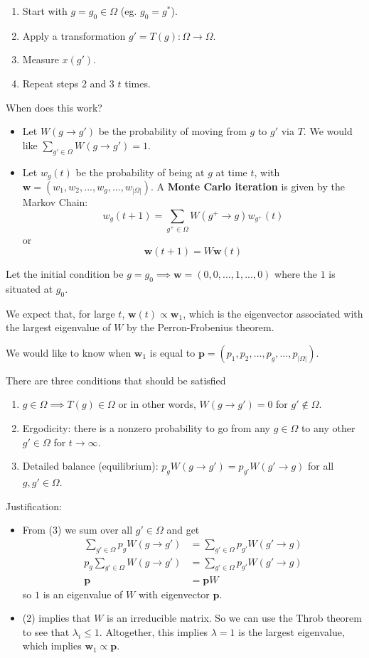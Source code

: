 \documentclass[12pt]{article}
\theoremstyle{definition}
\newcommand{\B}[1]{\boldsymbol{\boldsymbol{#1}}}
\begin{document}
\begin{enumerate}
    \item Start with $g=g_0\in\Omega$ (eg. $g_0=g^*$). 
    \item Apply a transformation $g'=T(g): \Omega\rightarrow\Omega$. 
    \item Measure $x(g')$. 
    \item Repeat steps 2 and 3 $t$ times. 
\end{enumerate}

When does this work? 
\begin{itemize}
    \item Let $W(g\rightarrow g')$ be the probability of moving from $g$ to $g'$ via $T$. We would like $\sum_{g'\in\Omega} W(g\rightarrow g')=1$. 
    \item Let $w_g(t)$ be the probability of being at $g$ at time $t$, with $\B{w}=(w_1,w_2,...,w_g,...,w_{|\Omega|})$. A \textbf{Monte Carlo iteration} is given by the Markov Chain: 
    \[
    w_g(t+1)=\sum_{g^+\in\Omega} W(g^+\rightarrow g) w_{g^+}(t)
    \]
    or
    \[
    \B{w}(t+1)=W\B{w}(t)
    \]
\end{itemize}

Let the initial condition be $g=g_0\implies \B{w}=(0,0,...,1,...,0)$ where the $1$ is situated at $g_0$. 

We expect that, for large $t$, $\B{w}(t)\propto\B{w}_1$, which is the eigenvector associated with the largest eigenvalue of $W$ by the Perron-Frobenius theorem.

We would like to know when $\B{w}_1$ is equal to $\B{p}=(p_1,p_2,...,p_g,...,p_{|\Omega|})$. 

There are three conditions that should be satisfied
\begin{enumerate}
    \item $g\in\Omega\implies T(g)\in\Omega$ or in other words, $W(g\to g')=0$ for $g'\notin \Omega$. 
    \item Ergodicity: there is a nonzero probability to go from any $g\in \Omega$ to any other $g'\in \Omega$ for $t\to \infty$.
    \item Detailed balance (equilibrium): $p_g W(g\to g')=p_{g'}W(g'\to g)$ for all $g,g'\in\Omega$. 
\end{enumerate}

Justification:
\begin{itemize}
    \item From (3) we sum over all $g'\in \Omega$ and get
    \begin{align*}
        \sum_{g'\in \Omega} p_gW(g\to g') &=  \sum_{g'\in \Omega} p_{g'}W(g'\to g)\\
        p_g \sum_{g'\in \Omega} W(g\to g')&= \sum_{g'\in \Omega} p_{g'}W(g'\to g)\\
        \boldsymbol p &= \boldsymbol p W 
    \end{align*}
    so $1$ is an eigenvalue of $W$ with eigenvector $\boldsymbol p$.
    \item (2) implies that $W$ is an irreducible matrix. So we can use the Throb theorem to see that $\lambda_i\leq 1$. Altogether, this implies $\lambda=1$ is the largest eigenvalue, which implies $\B{w}_1\propto\B{p}$. 
\end{itemize}
\end{document}
